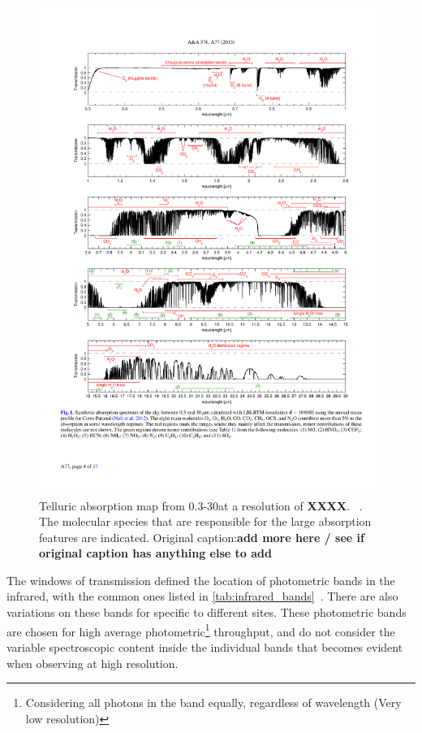 \begin{figure}
    \centering
    \includegraphics[width=0.9\linewidth]{figures/atmos_and_models/cropped_molecfit_absorption}
    \caption{Telluric absorption map from 0.3-30\um at a resolution of \textbf{XXXX}. ~\citet[][Figure~1]{smette_molecfit_2015}.
The molecular species that are responsible for the large absorption features are indicated.
        Original caption:\textbf{add more here / see if original caption has anything else to add}}
    \label{fig:croppedmolecfitabsorbtion}
\end{figure}

The windows of transmission defined the location of photometric bands in the infrared, with the common ones listed in \cref{tab:infrared_bands}~\citep[see e.g.][]{sterken_astronomical_1992, binney_galactic_1998}.
There are also variations on these bands for specific to different sites.
These photometric bands are chosen for high average photometric\footnote{Considering all photons in the band equally, regardless of wavelength (Very low resolution)} throughput, and do not consider the variable spectroscopic content inside the individual bands that becomes evident when observing at high resolution.

